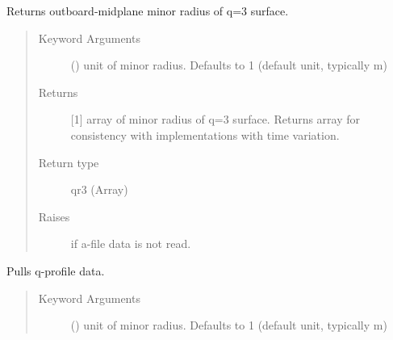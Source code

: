 \documentclass[letterpaper,10pt,english]{sphinxmanual}
\begin{document}
\begin{fulllineitems}
\begin{fulllineitems}
\end{fulllineitems}


\begin{fulllineitems}
\label{\detokenize{eqtools:eqtools.eqdskreader.EqdskReader.getQ3Surf}}
Returns outboard-midplane minor radius of q=3 surface.
\begin{quote}\begin{description}
\item[{Keyword Arguments}] \leavevmode
{} () \textendash{} unit of minor radius.  Defaults to 1
(default unit, typically m)

\item[{Returns}] \leavevmode
{[}1{]} array of minor radius of q=3 surface.  Returns
array for consistency with
{\hyperref[\detokenize{eqtools:eqtools.core.Equilibrium}]{}}
implementations with time variation.

\item[{Return type}] \leavevmode
qr3 (Array)

\item[{Raises}] \leavevmode
{} \textendash{} if a-file data is not read.

\end{description}\end{quote}

\end{fulllineitems}


\begin{fulllineitems}
\label{\detokenize{eqtools:eqtools.eqdskreader.EqdskReader.getQs}}
Pulls q-profile data.
\begin{quote}\begin{description}
\item[{Keyword Arguments}] \leavevmode
{} () \textendash{} unit of minor radius.  Defaults to 1
(default unit, typically m)


\end{description}
\end{quote}
\end{fulllineitems}
\end{fulllineitems}
\end{document}
